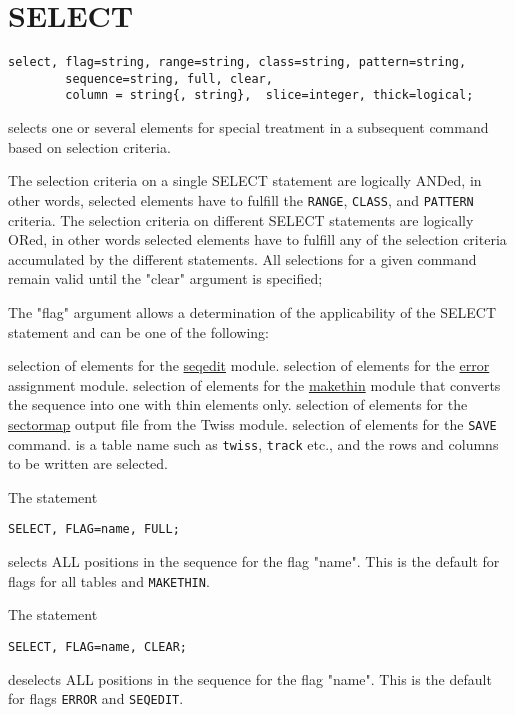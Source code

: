 \section{SELECT} 
\label{sec:select}

\begin{verbatim}
select, flag=string, range=string, class=string, pattern=string,
        sequence=string, full, clear,
        column = string{, string},  slice=integer, thick=logical;
\end{verbatim} 
selects one or several elements for special treatment in a subsequent
command based on selection criteria.

The selection criteria on a single SELECT statement are logically
ANDed, in other words, selected elements have to fulfill the {\tt RANGE},
{\tt CLASS}, and {\tt PATTERN} criteria.  
The selection criteria on different SELECT statements are logically
ORed, in other words selected elements have to fulfill any of the
selection criteria accumulated by the different statements.   
All selections for a given command remain valid until the "clear" argument
is specified; 

The "flag" argument allows a determination of the applicability of the
SELECT statement and can be one of the following: 
\begin{madlist}
    selection of elements for the
     \href{seqedit.html}{seqedit} module.  
    selection of elements for the
     \href{../error/error.html}{error} assignment module.  
    selection of elements for the
     \href{../makethin/makethin.html}{makethin} module that
     converts the sequence into one with thin elements only.  
    selection of elements for the
     \href{../Introduction/sectormap.html}{sectormap} output file
     from the Twiss module.  
    selection of elements for the {\tt SAVE} command.  
    is a table name such as {\tt twiss}, {\tt track}
     etc., and the rows and columns to be written are selected.  
\end{madlist} 

The statement
\begin{verbatim}
SELECT, FLAG=name, FULL;
\end{verbatim} 
selects ALL positions in the sequence for the flag "name". This is the default
for flags for all tables and {\tt MAKETHIN}.

The statement 
\begin{verbatim}
SELECT, FLAG=name, CLEAR;
\end{verbatim} 
deselects ALL positions in the sequence for the flag "name". This is the default
for flags {\tt ERROR} and {\tt SEQEDIT}.

